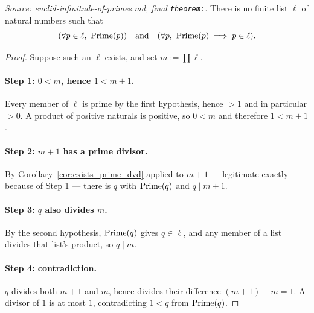 \begin{theorem}
  \leanok
  \label{thm:not_exists_prime_list}
  \textit{Source: euclid-infinitude-of-primes.md, final \texttt{theorem:}.}
  There is no finite list $\ell$ of natural numbers such that
  \[
    (\forall p \in \ell,\ \mathrm{Prime}(p)) \quad\text{and}\quad (\forall p,\ \mathrm{Prime}(p) \implies p \in \ell).
  \]
\end{theorem}
%
%
\begin{proof}
  \leanok
  Suppose such an $\ell$ exists, and set $m := \prod \ell$.

  \paragraph{Step 1: $0 < m$, hence $1 < m + 1$.}
  Every member of $\ell$ is prime by the first hypothesis, hence $> 1$ and in
  particular $> 0$. A product of positive naturals is positive, so $0 < m$ and
  therefore $1 < m + 1$.

  \paragraph{Step 2: $m + 1$ has a prime divisor.}
  By Corollary~\ref{cor:exists_prime_dvd} applied to $m + 1$ --- legitimate
  exactly because of Step 1 --- there is $q$ with $\mathrm{Prime}(q)$ and $q \mid m + 1$.

  \paragraph{Step 3: $q$ also divides $m$.}
  By the second hypothesis, $\mathrm{Prime}(q)$ gives $q \in \ell$, and any member of a
  list divides that list's product, so $q \mid m$.

  \paragraph{Step 4: contradiction.}
  $q$ divides both $m + 1$ and $m$, hence divides their difference
  $(m+1) - m = 1$. A divisor of $1$ is at most $1$, contradicting $1 < q$ from
  $\mathrm{Prime}(q)$.
\end{proof}

